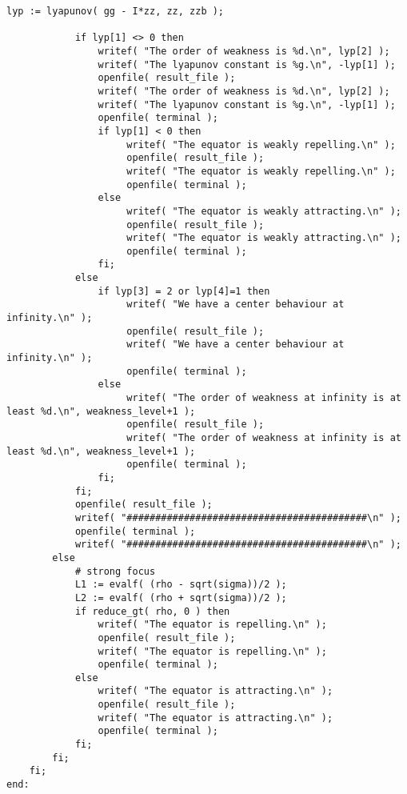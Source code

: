 \documentclass[a4paper,10pt]{article}
\begin{document}
\begin{lstlisting}[name=infinity]
            lyp := lyapunov( gg - I*zz, zz, zzb );

            if lyp[1] <> 0 then
                writef( "The order of weakness is %d.\n", lyp[2] );
                writef( "The lyapunov constant is %g.\n", -lyp[1] );
                openfile( result_file );
                writef( "The order of weakness is %d.\n", lyp[2] );
                writef( "The lyapunov constant is %g.\n", -lyp[1] );
                openfile( terminal );
                if lyp[1] < 0 then
                     writef( "The equator is weakly repelling.\n" );
                     openfile( result_file );
                     writef( "The equator is weakly repelling.\n" );
                     openfile( terminal );
                else
                     writef( "The equator is weakly attracting.\n" );
                     openfile( result_file );
                     writef( "The equator is weakly attracting.\n" );
                     openfile( terminal );
                fi;
            else
                if lyp[3] = 2 or lyp[4]=1 then
                     writef( "We have a center behaviour at infinity.\n" );
                     openfile( result_file );
                     writef( "We have a center behaviour at infinity.\n" );
                     openfile( terminal );
                else
                     writef( "The order of weakness at infinity is at least %d.\n", weakness_level+1 );
                     openfile( result_file );
                     writef( "The order of weakness at infinity is at least %d.\n", weakness_level+1 );
                     openfile( terminal );
                fi;
            fi;
            openfile( result_file );
            writef( "##########################################\n" );
            openfile( terminal );
            writef( "##########################################\n" );
        else
            # strong focus
            L1 := evalf( (rho - sqrt(sigma))/2 );
            L2 := evalf( (rho + sqrt(sigma))/2 );
            if reduce_gt( rho, 0 ) then
                writef( "The equator is repelling.\n" );
                openfile( result_file );
                writef( "The equator is repelling.\n" );
                openfile( terminal );
            else
                writef( "The equator is attracting.\n" );
                openfile( result_file );
                writef( "The equator is attracting.\n" );
                openfile( terminal );
            fi;
        fi;
    fi;
end:
\end{lstlisting}
\end{document}
